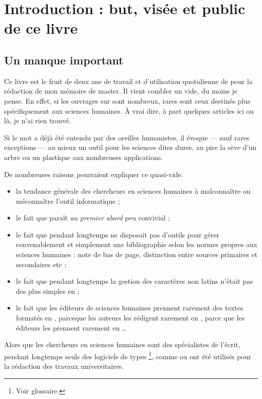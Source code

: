 \chapter{Introduction : but, visée et public de ce livre}
\section{Un manque important}

Ce livre est le fruit de deux ans de travail et d'utilisation quotidienne de \logiciel{\LaTeX} pour la rédaction de mon mémoire de master. Il vient combler un vide, du moins je pense. En effet, si les ouvrages sur \logiciel{\LaTeX} sont nombreux, rares sont ceux destinés plus spécifiquement aux sciences humaines. À vrai dire, à part quelques articles ici ou là, je n'ai rien trouvé.


Si le mot \logiciel{\LaTeX} a déjà été entendu par des oreilles humanistes, il évoque --- sauf rares exceptions --- au mieux un outil pour les sciences dites dures, au pire la sève d'un arbre ou un plastique aux nombreuses applications. 

De nombreuses raisons pourraient expliquer ce quasi-vide.
\begin{itemize}
\item la tendance générale des chercheurs en sciences humaines à malconnaître ou méconnaître l'outil informatique ;
\item le fait que \logiciel{\LaTeX} paraît \emph{au premier abord} peu convivial ;
\item le fait que pendant longtemps \logiciel{\LaTeX} ne disposait pas d'outils pour gérer convenablement et simplement une bibliographie selon les normes propres aux sciences humaines : note de bas de page, distinction entre sources primaires et secondaires etc ;
\item le fait que pendant longtemps la gestion des caractères non latins n'était pas des plus simples en \logiciel{\LaTeX} ;
\item le fait que les éditeurs de sciences humaines prennent rarement des textes formatés en \logiciel{\LaTeX}, parceque les auteurs les rédigent rarement en \logiciel{\LaTeX}, parce que les éditeurs les prennent rarement en \logiciel{\LaTeX} \ldots
\end{itemize}

Alors que les chercheurs en sciences humaines sont des spécialistes de l'écrit, pendant longtemps seuls des logiciels de types \footnote{Voir glossaire.}, comme  ou  ont été utilisés pour la rédaction des travaux universitaires.

